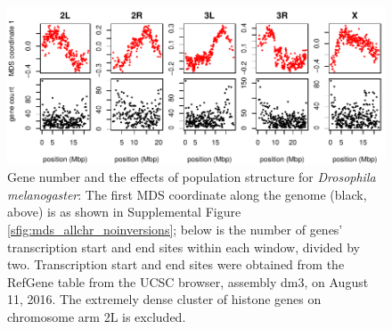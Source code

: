 \documentclass[11pt, oneside]{article}   	%
\begin{document}
\begin{figure}
    \begin{center}
        \includegraphics{MDS_and_gene_count_allchr_drosophila_win104_try}
    \end{center}
    \caption{
        Gene number and the effects of population structure for \textit{Drosophila melanogaster}:
        The first MDS coordinate along the genome (black, above) is as shown in Supplemental Figure \ref{sfig:mds_allchr_noinversions};
        below is the number of genes' transcription start and end sites within each window, divided by two.
        Transcription start and end sites were obtained from the RefGene table from the UCSC browser, assembly dm3, on August 11, 2016.
        The extremely dense cluster of histone genes on chromosome arm 2L is excluded.
        \label{sfig:drosophila_gene_density_plots}
    }
\end{figure}
\end{document}
